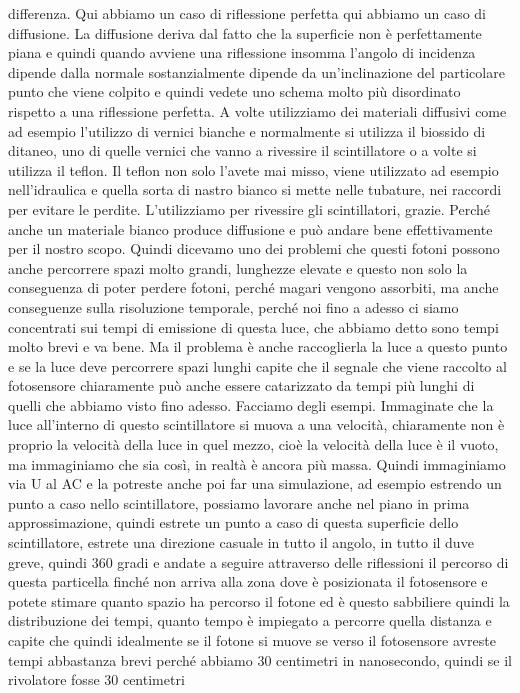 {differenza. Qui abbiamo un caso di riflessione perfetta qui abbiamo un caso di diffusione. La diffusione deriva dal fatto che la superficie non è perfettamente piana e quindi quando avviene una riflessione insomma l'angolo di incidenza dipende dalla normale sostanzialmente dipende da un'inclinazione del particolare punto che viene colpito e quindi vedete uno schema molto più disordinato rispetto a una riflessione perfetta. A volte utilizziamo dei materiali diffusivi come ad esempio l'utilizzo di vernici bianche e normalmente si utilizza il biossido di ditaneo, uno di quelle vernici che vanno a rivessire il scintillatore o a volte si utilizza il teflon. Il teflon non solo l'avete mai misso, viene utilizzato ad esempio nell'idraulica e quella sorta di nastro bianco si mette nelle tubature, nei raccordi per evitare le perdite. L'utilizziamo per rivessire gli scintillatori, grazie. Perché anche un materiale bianco produce diffusione e può andare bene effettivamente per il nostro scopo. Quindi dicevamo uno dei problemi che questi fotoni possono anche percorrere spazi molto grandi, lunghezze elevate e questo non solo la conseguenza di poter perdere fotoni, perché magari vengono assorbiti, ma anche conseguenze sulla risoluzione temporale, perché noi fino a adesso ci siamo concentrati sui tempi di emissione di questa luce, che abbiamo detto sono tempi molto brevi e va bene. Ma il problema è anche raccoglierla la luce a questo punto e se la luce deve percorrere spazi lunghi capite che il segnale che viene raccolto al fotosensore chiaramente può anche essere catarizzato da tempi più lunghi di quelli che abbiamo visto fino adesso. Facciamo degli esempi. Immaginate che la luce all'interno di questo scintillatore si muova a una velocità, chiaramente non è proprio la velocità della luce in quel mezzo, cioè la velocità della luce è il vuoto, ma immaginiamo che sia così, in realtà è ancora più massa. Quindi immaginiamo via U al AC e la potreste anche poi far una simulazione, ad esempio estrendo un punto a caso nello scintillatore, possiamo lavorare anche nel piano in prima approssimazione, quindi estrete un punto a caso di questa superficie dello scintillatore, estrete una direzione casuale in tutto il angolo, in tutto il duve greve, quindi 360 gradi e andate a seguire attraverso delle riflessioni il percorso di questa particella finché non arriva alla zona dove è posizionata il fotosensore e potete stimare quanto spazio ha percorso il fotone ed è questo sabbiliere quindi la distribuzione dei tempi, quanto tempo è impiegato a percorre quella distanza e capite che quindi idealmente se il fotone si muove se verso il fotosensore avreste tempi abbastanza brevi perché abbiamo 30 centimetri in nanosecondo, quindi se il rivolatore fosse 30 centimetri 

}
